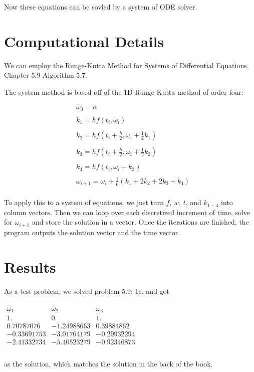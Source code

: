 \documentclass[12pt]{article}
\begin{document}
Now these equations can be sovled by a system of ODE solver.

\section{Computational Details}

We can employ the Runge-Kutta Method for Systems of Differential Equations, Chapter 5.9 Algorithm 5.7.

The system method is based off of the 1D Runge-Kutta method of order four:

\begin{equation}
\begin{aligned}
&\omega_0 = \alpha\\
\\
&k_1 = hf(t_i,\omega_i)\\
\\
&k_2 = hf(t_i + \frac{h}{2},\omega_i + \frac{1}{2}k_1)\\
\\
&k_3 = hf(t_i + \frac{h}{2},\omega_i + \frac{1}{2}k_2)\\
\\
&k_4 = hf(t_i,\omega_i+k_3)\\
\\
&\omega_{i+1} = \omega_i + \frac{1}{6}(k_1+2k_2+2k_3+k_4)\\
\end{aligned}
\end{equation}

To apply this to a system of equations, we just turn $f$, $w$, $t$, and $k_{1-4}$ into column vectors.
Then we can loop over each discretized increment of time, solve for $\omega_{i+1}$ and store the solution in a vector.
Once the iterations are finished, the program outputs the solution vector and the time vector. 


\section{Results}

As a test problem, we solved problem 5.9: 1c. and got
\\
\\
$
\begin{array}{lll}
 \omega_1   &     \omega_2& \omega_3 \\
 1.         &         0.  &      1.         \\
 0.70787076 & -1.24988663 &  0.39884862 \\
-0.33691753 & -3.01764179 & -0.29932294 \\
-2.41332734 & -5.40523279 & -0.92346873 \\
\end{array}  
$
\\
\\
as the solution, which matches the solution in the back of the book. 
 
\end{document}
